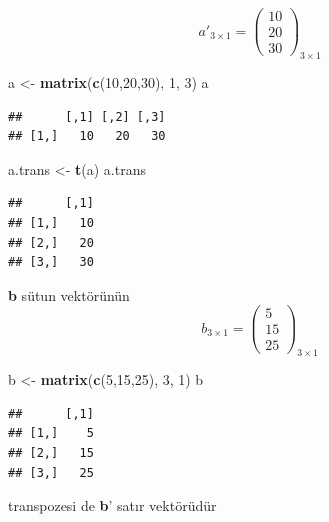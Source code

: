 \documentclass[
]{book}
\newenvironment{Shaded}{\begin{snugshade}}{\end{snugshade}}
\newcommand{\DecValTok}[1]{\textcolor[rgb]{0.00,0.00,0.81}{#1}}
\newcommand{\FunctionTok}[1]{\textcolor[rgb]{0.13,0.29,0.53}{\textbf{#1}}}
\newcommand{\NormalTok}[1]{#1}
\newcommand{\OtherTok}[1]{\textcolor[rgb]{0.56,0.35,0.01}{#1}}
\begin{document}
\[a'_{3×1} =
\begin{pmatrix}
 10 \\
 20 \\
 30
\end{pmatrix}_{3×1}\]

\begin{Shaded}
\begin{Highlighting}[]
\NormalTok{ a }\OtherTok{\textless{}{-}} \FunctionTok{matrix}\NormalTok{(}\FunctionTok{c}\NormalTok{(}\DecValTok{10}\NormalTok{,}\DecValTok{20}\NormalTok{,}\DecValTok{30}\NormalTok{), }\DecValTok{1}\NormalTok{, }\DecValTok{3}\NormalTok{) }
\NormalTok{ a }
\end{Highlighting}
\end{Shaded}

\begin{verbatim}
##      [,1] [,2] [,3]
## [1,]   10   20   30
\end{verbatim}

\begin{Shaded}
\begin{Highlighting}[]
\NormalTok{ a.trans }\OtherTok{\textless{}{-}} \FunctionTok{t}\NormalTok{(a)}
\NormalTok{ a.trans}
\end{Highlighting}
\end{Shaded}

\begin{verbatim}
##      [,1]
## [1,]   10
## [2,]   20
## [3,]   30
\end{verbatim}

\textbf{b} sütun vektörünün
\[b_{3×1} =
\begin{pmatrix}
 5 \\
 15 \\
 25
\end{pmatrix}_{3×1}\]

\begin{Shaded}
\begin{Highlighting}[]
\NormalTok{ b }\OtherTok{\textless{}{-}} \FunctionTok{matrix}\NormalTok{(}\FunctionTok{c}\NormalTok{(}\DecValTok{5}\NormalTok{,}\DecValTok{15}\NormalTok{,}\DecValTok{25}\NormalTok{), }\DecValTok{3}\NormalTok{, }\DecValTok{1}\NormalTok{) }
\NormalTok{ b }
\end{Highlighting}
\end{Shaded}

\begin{verbatim}
##      [,1]
## [1,]    5
## [2,]   15
## [3,]   25
\end{verbatim}

transpozesi de \textbf{b}' satır vektörüdür
\end{document}
